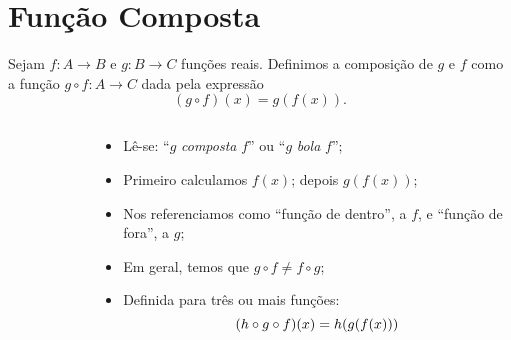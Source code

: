 \section{Função Composta}

\begin{frame}
  \begin{definition}
    Sejam $f:A\rightarrow B$ e $g:B\rightarrow C$ funções reais. Definimos a composição de $g$ e $f$ como a função $g\circ f:A\rightarrow C$ dada pela expressão
    \begin{equation*}
      (g\circ f)(x) = g(f(x)).
    \end{equation*}
  \end{definition}
  \begin{columns}[onlytextwidth]
    \begin{column}{0.49\textwidth}
      \begin{figure}
      \end{figure}
    \end{column}
    \begin{column}{0.49\textwidth}
      \begin{highlight}
        \begin{itemize}
          \item Lê-se: ``$g$ \emph{composta} $f$'' ou ``$g$ \emph{bola} $f$'';
          \item Primeiro calculamos $f(x)$; depois $g(f(x))$; 
          \item Nos referenciamos como ``função de dentro'', a $f$, e ``função de fora'', a $g$;
          \item Em geral, temos que $g\circ f \not= f\circ g$;
          \item Definida para três ou mais funções:\vspace*{-0.1cm}
          \begin{equation*}
            (h\circ g\circ f)(x) = h(g(f(x)))\vspace*{-0.1cm}
          \end{equation*}
        \end{itemize}
      \end{highlight}
    \end{column}
  \end{columns}
\end{frame}

